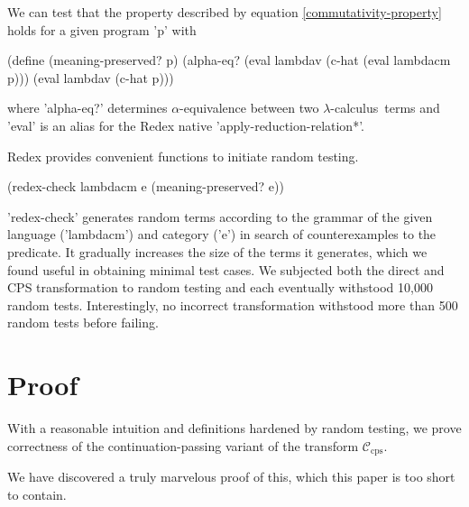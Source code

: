 \documentclass{llncs}
\newcommand{\lc}[0]{$\lambda$-calculus}
\begin{document}


We can test that the property described by equation \ref{commutativity-property} holds for a given program \scheme'p' with 
\begin{schemedisplay}
(define (meaning-preserved? p)
  (alpha-eq? (eval lambdav (c-hat (eval lambdacm p))) (eval lambdav (c-hat p)))
\end{schemedisplay}
where \scheme'alpha-eq?' determines $\alpha$-equivalence between two \lc\ terms and \scheme'eval' is an alias for the Redex native \scheme'apply-reduction-relation*'.

Redex provides convenient functions to initiate random testing.

\begin{schemedisplay}
(redex-check lambdacm e (meaning-preserved? e))
\end{schemedisplay}

\scheme'redex-check' generates random terms according to the grammar of the given language (\scheme'lambdacm') and category (\scheme'e') in search of counterexamples to the predicate. It gradually increases the size of the terms it generates, which we found useful in obtaining minimal test cases. We subjected both the direct and CPS transformation to random testing and each eventually withstood 10,000 random tests. Interestingly, no incorrect transformation withstood more than 500 random tests before failing.

\section{Proof}
\label{sec-proof}

With a reasonable intuition and definitions hardened by random testing, we prove correctness of the continuation-passing variant of the transform $\mathcal{C}_{\mathrm{cps}}$.

We have discovered a truly marvelous proof of this, which this paper is too short to contain.
\end{document}
